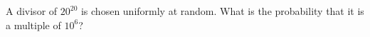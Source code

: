 A divisor of $20^{20}$ is chosen uniformly at random. What is the probability that it is a multiple of $10^6$?
